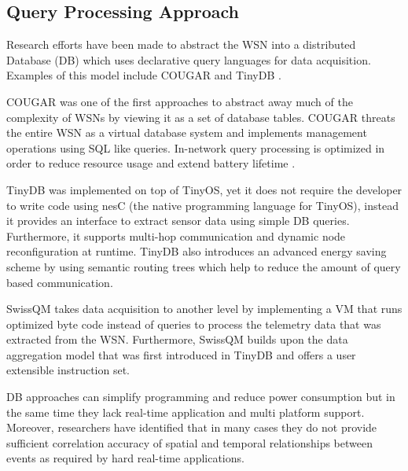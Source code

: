 \subsection{Query Processing Approach}
Research efforts have been made to abstract the WSN into a distributed Database (DB) which uses declarative query languages for data acquisition. Examples of this model include COUGAR \cite{yao2002cougar} and TinyDB \cite{madden2005tinydb}.

COUGAR \cite{yao2002cougar} was one of the first approaches to abstract away much of the
complexity of WSNs by viewing it as a set of database tables. COUGAR threats the entire WSN as a virtual database system and implements management operations using SQL like queries. In-network query processing is optimized in order to reduce resource usage and extend battery lifetime .  

TinyDB \cite{madden2005tinydb} was implemented on top of TinyOS, yet it does not require the developer to write code using nesC (the native programming language for TinyOS), instead it provides an interface to extract sensor data using simple DB queries. Furthermore, it supports multi-hop communication and dynamic node reconfiguration at runtime. TinyDB also introduces an advanced energy saving scheme by using semantic routing trees which help to reduce the amount of query based communication.

SwissQM \cite{mueller2007swissqm} takes data acquisition to another level by implementing a VM that runs optimized byte code instead of queries to process the telemetry data that was extracted from the WSN. Furthermore, SwissQM builds upon the data aggregation model that was first introduced in TinyDB and offers a user extensible instruction set. 


DB approaches can simplify programming and reduce power consumption but in the same time they lack real-time application and multi platform support. Moreover, researchers have identified \cite{hadim2006middleware,yick2008wireless} that in many cases they do not provide sufficient correlation accuracy of spatial and temporal relationships between events as required by hard real-time applications.
